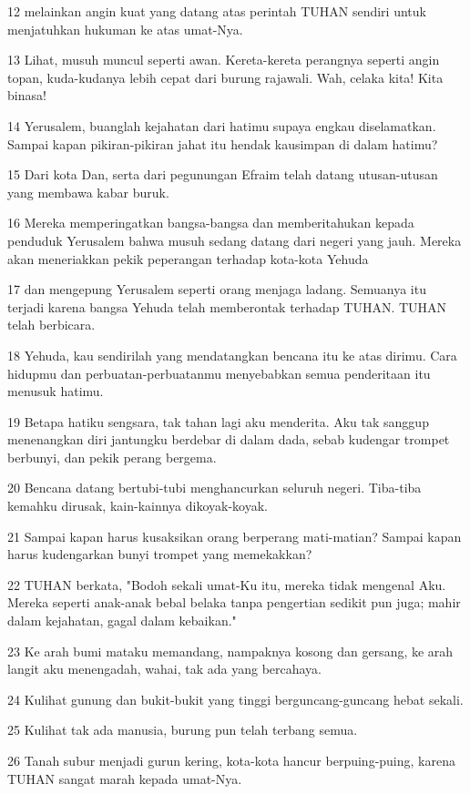 \par 12 melainkan angin kuat yang datang atas perintah TUHAN sendiri untuk menjatuhkan hukuman ke atas umat-Nya.
\par 13 Lihat, musuh muncul seperti awan. Kereta-kereta perangnya seperti angin topan, kuda-kudanya lebih cepat dari burung rajawali. Wah, celaka kita! Kita binasa!
\par 14 Yerusalem, buanglah kejahatan dari hatimu supaya engkau diselamatkan. Sampai kapan pikiran-pikiran jahat itu hendak kausimpan di dalam hatimu?
\par 15 Dari kota Dan, serta dari pegunungan Efraim telah datang utusan-utusan yang membawa kabar buruk.
\par 16 Mereka memperingatkan bangsa-bangsa dan memberitahukan kepada penduduk Yerusalem bahwa musuh sedang datang dari negeri yang jauh. Mereka akan meneriakkan pekik peperangan terhadap kota-kota Yehuda
\par 17 dan mengepung Yerusalem seperti orang menjaga ladang. Semuanya itu terjadi karena bangsa Yehuda telah memberontak terhadap TUHAN. TUHAN telah berbicara.
\par 18 Yehuda, kau sendirilah yang mendatangkan bencana itu ke atas dirimu. Cara hidupmu dan perbuatan-perbuatanmu menyebabkan semua penderitaan itu menusuk hatimu.
\par 19 Betapa hatiku sengsara, tak tahan lagi aku menderita. Aku tak sanggup menenangkan diri jantungku berdebar di dalam dada, sebab kudengar trompet berbunyi, dan pekik perang bergema.
\par 20 Bencana datang bertubi-tubi menghancurkan seluruh negeri. Tiba-tiba kemahku dirusak, kain-kainnya dikoyak-koyak.
\par 21 Sampai kapan harus kusaksikan orang berperang mati-matian? Sampai kapan harus kudengarkan bunyi trompet yang memekakkan?
\par 22 TUHAN berkata, "Bodoh sekali umat-Ku itu, mereka tidak mengenal Aku. Mereka seperti anak-anak bebal belaka tanpa pengertian sedikit pun juga; mahir dalam kejahatan, gagal dalam kebaikan."
\par 23 Ke arah bumi mataku memandang, nampaknya kosong dan gersang, ke arah langit aku menengadah, wahai, tak ada yang bercahaya.
\par 24 Kulihat gunung dan bukit-bukit yang tinggi berguncang-guncang hebat sekali.
\par 25 Kulihat tak ada manusia, burung pun telah terbang semua.
\par 26 Tanah subur menjadi gurun kering, kota-kota hancur berpuing-puing, karena TUHAN sangat marah kepada umat-Nya.
